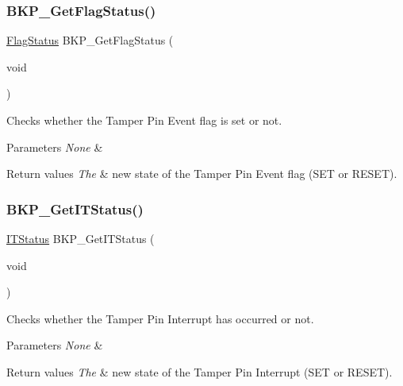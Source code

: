 \subsubsection{\texorpdfstring{BKP\_GetFlagStatus()}{BKP\_GetFlagStatus()}}
{\footnotesize\ttfamily \mbox{\hyperlink{group___exported__types_ga89136caac2e14c55151f527ac02daaff}{Flag\+Status}} B\+K\+P\+\_\+\+Get\+Flag\+Status (\begin{DoxyParamCaption}\item[{void}]{ }\end{DoxyParamCaption})}



Checks whether the Tamper Pin Event flag is set or not. 


\begin{DoxyParams}{Parameters}
{\em None} & \\
\hline
\end{DoxyParams}

\begin{DoxyRetVals}{Return values}
{\em The} & new state of the Tamper Pin Event flag (S\+ET or R\+E\+S\+ET). \\
\hline
\end{DoxyRetVals}
\mbox{\label{group___b_k_p___private___functions_ga99566c9f1f17f499020606cb63511494}} 
\subsubsection{\texorpdfstring{BKP\_GetITStatus()}{BKP\_GetITStatus()}}
{\footnotesize\ttfamily \mbox{\hyperlink{group___exported__types_gaacbd7ed539db0aacd973a0f6eca34074}{I\+T\+Status}} B\+K\+P\+\_\+\+Get\+I\+T\+Status (\begin{DoxyParamCaption}\item[{void}]{ }\end{DoxyParamCaption})}



Checks whether the Tamper Pin Interrupt has occurred or not. 


\begin{DoxyParams}{Parameters}
{\em None} & \\
\hline
\end{DoxyParams}

\begin{DoxyRetVals}{Return values}
{\em The} & new state of the Tamper Pin Interrupt (S\+ET or R\+E\+S\+ET). \\
\hline
\end{DoxyRetVals}
\mbox{\label{group___b_k_p___private___functions_gab8dbd0c4773f6edb98a28c8ff6a2ead0}} 
